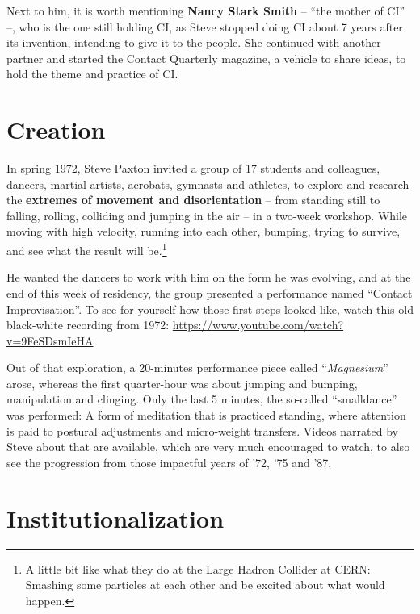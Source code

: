 Next to him, it is worth mentioning \textbf{Nancy Stark Smith} -- ``the mother of CI'' --, who is the one still holding CI, as Steve stopped doing CI about 7 years after its invention, intending to give it to the people.
She continued with another partner and started the Contact Quarterly magazine, a vehicle to share ideas, to hold the theme and practice of CI\@.

\section{Creation}\label{sec:creation}

In spring 1972, Steve Paxton invited a group of 17 students and colleagues, dancers, martial artists, acrobats, gymnasts and athletes, to explore and research the \textbf{extremes of movement and disorientation} -- from standing still to falling, rolling, colliding and jumping in the air -- in a two-week workshop.
While moving with high velocity, running into each other, bumping, trying to survive, and see what the result will be.\footnote{A little bit like what they do at the Large Hadron Collider at CERN: Smashing some particles at each other and be excited about what would happen.}

He wanted the dancers to work with him on the form he was evolving, and at the end of this week of residency, the group presented a performance named ``Contact Improvisation''.
To see for yourself how those first steps looked like, watch this old black-white recording from 1972: \url{https://www.youtube.com/watch?v=9FeSDsmIeHA}

Out of that exploration, a 20-minutes performance piece called ``\textit{Magnesium}'' arose, whereas the first quarter-hour was about jumping and bumping, manipulation and clinging.
Only the last 5 minutes, the so-called ``\gls{smalldance}'' was performed: A form of meditation that is practiced standing, where attention is paid to postural adjustments and micro-weight transfers.
Videos narrated by Steve about that are available, which are very much encouraged to watch, to also see the progression from those impactful years of '72, '75 and '87.

\section{Institutionalization}\label{sec:institutionalization}

